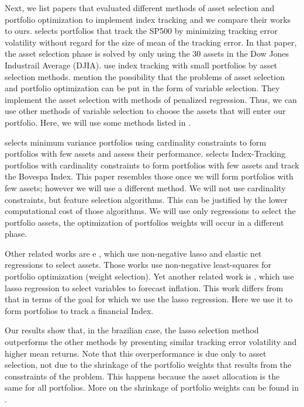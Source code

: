 \documentclass[preprint, doubleblind, authoryear,10pt]{elsarticle}
\begin{document}
Next, we list papers that evaluated different methods of asset selection and portfolio optimization to implement index tracking and we compare their works to ours.
%
\cite{liu-2009} selects portfolios that track the SP500 by minimizing tracking error volatility without regard for the size of mean of the tracking error.
In that paper, the asset selection phase is solved by only using the 30 assets in the Dow Jones Industrail Average (DJIA).
\cite{dijk2002} use index tracking with small portfolios by asset selection methods.
\cite{PLS10} mention the possibility that the problems of asset selection and portfolio optimization can be put in the form of variable selection.
They implement the asset selection with methods of penalized regression.
Thus, we can use other methods of variable selection to choose the assets that will enter our portfolio.
Here, we will use some methods listed in \cite{isl-2014}.

\cite{santos15} selects minimum variance portfolios using cardinality constraints to form portfolios with few assets and assess their performance.
\cite{rbfin-it} selects Index-Tracking portfolios with cardinality constraints to form portfolios with few assets and track the Bovespa Index.
This paper resembles those once we will form portfolios with few assets; however we will use a different method.
We will not use cardinality constraints, but feature selection algorithms.
This can be justified by the lower computational cost of those algorithms.
We will use only regressions to select the portfolio assets, the optimization of portfolios weights will occur in a different phase.

Other related works are \cite{nnl14} e \cite{nnen14}, which use non-negative lasso and elastic net regressions to select assets.
Those works use non-negative least-squares for portfolio optimization (weight selection).
Yet another related work is \cite{lasso-infl}, which use lasso regression to select variables to forecast inflation.
This work differs from that in terms of the goal for which we use the lasso regression.
Here we use it to form portfolios to track a financial Index.


Our results show that, in the brazilian case, the lasso selection method outperforms the other methods by presenting similar tracking error volatility and higher mean returns.
Note that this overperformance is due only to asset selection, not due to the shrinkage of the portfolio weights that results from the consstraints of the problem.
This happens because the asset allocation is the same for all portfolios.
More on the shrinkage of portfolio weights can be found in \cite{fan-2012, jag-2003, brodie2009}.
\end{document}
